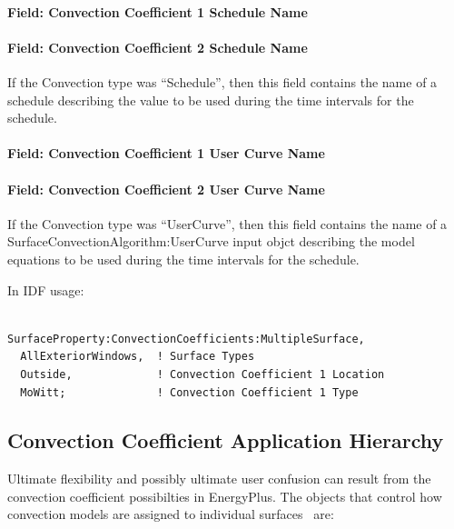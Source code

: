 \paragraph{Field: Convection Coefficient 1 Schedule Name}\label{field-convection-coefficient-1-schedule-name-1}

\paragraph{Field: Convection Coefficient 2 Schedule Name}\label{field-convection-coefficient-2-schedule-name-1}

If the Convection type was ``Schedule'', then this field contains the name of a schedule describing the value to be used during the time intervals for the schedule.

\paragraph{Field: Convection Coefficient 1 User Curve Name}\label{field-convection-coefficient-1-user-curve-name-1}

\paragraph{Field: Convection Coefficient 2 User Curve Name}\label{field-convection-coefficient-2-user-curve-name-1}

If the Convection type was ``UserCurve'', then this field contains the name of a SurfaceConvectionAlgorithm:UserCurve input objct describing the model equations to be used during the time intervals for the schedule.

In IDF usage:

\begin{lstlisting}

SurfaceProperty:ConvectionCoefficients:MultipleSurface,
  AllExteriorWindows,  ! Surface Types
  Outside,             ! Convection Coefficient 1 Location
  MoWitt;              ! Convection Coefficient 1 Type
\end{lstlisting}

\subsection{Convection Coefficient Application Hierarchy}\label{convection-coefficient-application-hierarchy}

Ultimate flexibility and possibly ultimate user confusion can result from the convection coefficient possibilties in EnergyPlus. The objects that control how convection models are assigned to individual surfaces~ are:

